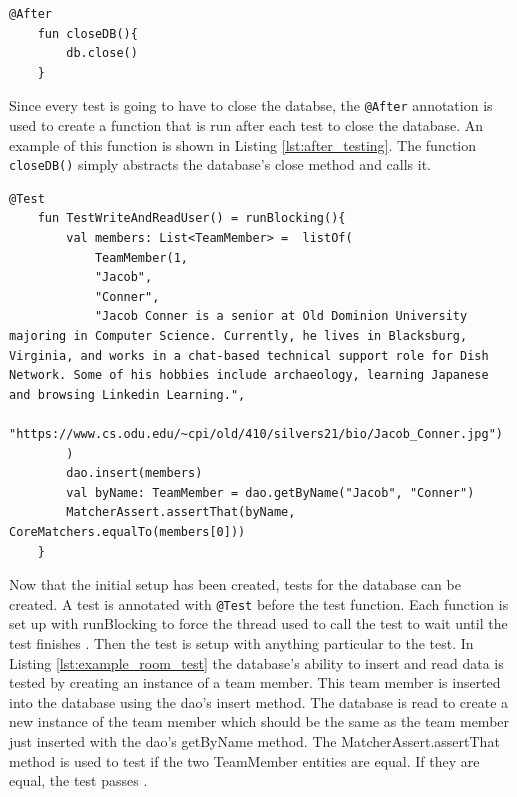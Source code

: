 \documentclass[12pt]{article}
\begin{document}
   \begin{lstlisting}[numbers=none, 
			caption=Code to close the Database after the test,
			label={lst:after_testing}]
    @After
    fun closeDB(){
        db.close()
    }
\end{lstlisting}

Since every test is going to have to close the databse, the \verb|@After| annotation is used to create a function that is run after each test to close the database. An example of this function is shown in Listing \ref{lst:after_testing}. The function \verb|closeDB()| simply abstracts the database's close method and calls it. 

   \begin{lstlisting}[numbers=none, 
			caption=Example Test for Room Database,
			label={lst:example_room_test}]
    @Test
    fun TestWriteAndReadUser() = runBlocking(){
        val members: List<TeamMember> =  listOf(
            TeamMember(1,
            "Jacob",
            "Conner",
            "Jacob Conner is a senior at Old Dominion University majoring in Computer Science. Currently, he lives in Blacksburg, Virginia, and works in a chat-based technical support role for Dish Network. Some of his hobbies include archaeology, learning Japanese and browsing Linkedin Learning.",
            "https://www.cs.odu.edu/~cpi/old/410/silvers21/bio/Jacob_Conner.jpg")
        )
        dao.insert(members)
        val byName: TeamMember = dao.getByName("Jacob", "Conner")
        MatcherAssert.assertThat(byName, CoreMatchers.equalTo(members[0]))
    }
\end{lstlisting}

Now that the initial setup has been created, tests for the database can be created. A test is annotated with  \verb|@Test| before the test function.  Each function is set up with runBlocking to force the thread used to call the test to wait until the test finishes \cite{kotlinCoroutines}.  Then the test is setup with anything particular to the test. In Listing \ref{lst:example_room_test} the database's ability to insert and read data is tested by creating an instance of a team member. This team member is inserted into the database using the dao's insert method. The database is read to create a new instance of the team member which should be the same as the team member just inserted with the dao's getByName method. The MatcherAssert.assertThat method is used to test if the two TeamMember entities are equal. If they are equal, the test passes \cite{SimplifiedCodingRoomTesting}. 
\end{document}
